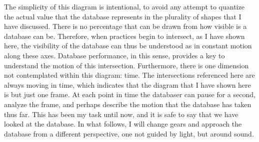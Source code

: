The simplicity of this diagram is intentional, to avoid any attempt to quantize the actual value that the database represents in the plurality of shapes that I have discussed. There is no percentage that can be drawn from how visible is a database can be. Therefore, when practices begin to intersect, as I have shown here, the visibility of the database can thus be understood as in constant motion along these axes. Database performance, in this sense, provides a key to understand the motion of this intersection. Furthermore, there is one dimension not contemplated within this diagram: time. The intersections referenced here are always moving in time, which indicates that the diagram that I have shown here is but just one frame. At each point in time the databaser can pause for a second, analyze the frame, and perhaps describe the motion that the database has taken thus far. This has been my task until now, and it is safe to say that we have looked at the database. In what follows, I will change gears and approach the database from a different perspective, one not guided by light, but around sound.
